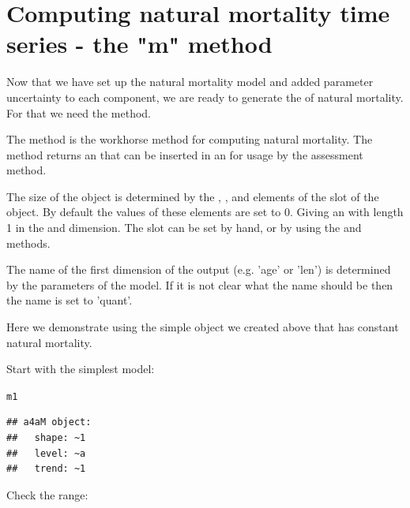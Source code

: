 \documentclass[a4paper,english,10pt]{article}\usepackage[]{graphicx}\usepackage[]{color}
\makeatletter
\newcommand{\hlstd}[1]{\textcolor[rgb]{0.196,0.196,0.196}{#1}}%
\newenvironment{kframe}{%
 \def\at@end@of@kframe{}%
 \ifinner\ifhmode%
  \def\at@end@of@kframe{\end{minipage}}%
  \begin{minipage}{\columnwidth}%
 \fi\fi%
 \def\FrameCommand##1{\hskip\@totalleftmargin \hskip-\fboxsep
 \colorbox{shadecolor}{##1}\hskip-\fboxsep
     \hskip-\linewidth \hskip-\@totalleftmargin \hskip\columnwidth}%
 \MakeFramed {\advance\hsize-\width
   \@totalleftmargin\z@ \linewidth\hsize
   \@setminipage}}%
 {\par\unskip\endMakeFramed%
 \at@end@of@kframe}
\newenvironment{knitrout}{}{} %
\makeatother
\begin{document}
\section{Computing natural mortality time series - the "m" method}

Now that we have set up the natural mortality  model and added parameter uncertainty to each component, we are ready to generate the  of natural mortality. For that we need the  method.

The  method is the workhorse method for computing natural mortality. The method returns an  that can be inserted in an  for usage by the assessment method.


The size of the  object is determined by the , ,  and  elements of the  slot of the  object. By default the values of these elements are set to 0. Giving an  with length 1 in the  and  dimension. The  slot can be set by hand, or by using the  and  methods.

The name of the first dimension of the output  (e.g. 'age' or 'len') is determined by the parameters of the  model. If it is not clear what the name should be then the name is set to 'quant'.

Here we demonstrate  using the simple  object we created above that has constant natural mortality.

Start with the simplest model:

\begin{knitrout}
\color{fgcolor}\begin{kframe}
\begin{alltt}
\hlstd{m1}
\end{alltt}
\begin{verbatim}
## a4aM object:
##   shape: ~1
##   level: ~a
##   trend: ~1
\end{verbatim}
\end{kframe}
\end{knitrout}

Check the range:
\end{document}

